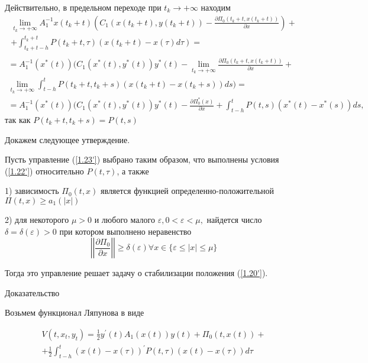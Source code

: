 Действительно, в предельном переходе при $t_k \to + \infty$ находим 
$$
\begin{array}{c}
\displaystyle \lim_{t_k \to + \infty} A_1^{-1} x(t_k + t) (C_1 (x(t_k + t), y(t_k + t)) - \frac{\partial \Pi_0 (t_k + t, x(t_k + t))}{\partial x})+\\
\displaystyle + \int_{t_k+t-h}^{t_k+t} P(t_k + t, \tau) (x(t_k + t) - x(\tau) d \tau)=\\
\end{array}
$$
$$
\begin{array}{c}
\displaystyle = A_1^{-1} (x^{*} (t)) (C_1 (x^{*}(t), y^{*}(t)) y^{*}(t) - \lim_{t_k \to + \infty} \frac{\partial \Pi_0 (t_k +t, x (t_k + t))}{\partial x} +\\
\displaystyle \lim_{t_k \to + \infty} \int_{t - h}^{t} P(t_k + t, t_k + s) ( x(t_k + t) - x(t_k + s)) ds) =\\
\displaystyle =A_1^{-1} ( x^{*} (t)) (C_1 (x^{*} (t), y^{*}(t)) y^{*} (t) - \frac{\partial \Pi_0^{*} (x)}{\partial x} + \int_{t - h}^{t} P (t, s) (x^{*} (t) - x^{*} (s)) ds,
\end{array}
$$
так как $P(t_k + t, t_k + s) = P(t, s)$

Докажем следующее утверждение. 

\begin{theorem} \label{1.6'}
Пусть управление (\ref{1.23'}) выбрано таким образом, что выполнены условия (\ref{1.22'}) относительно $P(t, \tau)$, а также 

1) зависимость $\Pi_0 (t, x)$ является функцией определенно-положительной $\Pi (t, x) \ge a_1 (\left| x \right|)$

 2) для некоторого $\mu > 0$ и любого малого $\varepsilon, 0 < \varepsilon < \mu, $ найдется число $\delta = \delta (\varepsilon) > 0$ при котором выполнено неравенство $$\left| \left| \frac{\partial \Pi_0}{\partial x} \right| \right| \ge \delta (\varepsilon) \forall x \in \lbrace \varepsilon \le \left| x \right| \le \mu \rbrace$$

Тогда это управление решает задачу о стабилизации положения (\ref{1.20'}).
\end{theorem}

Доказательство

Возьмем функционал Ляпунова в виде 

\begin{equation} \label{1.26'}
	\begin{array}{c}
		\displaystyle V(t, x_t, y_t) = \frac12 y^{'} (t) A_1(x(t)) y(t) + \Pi_0(t, x(t)) +\\
		\displaystyle + \frac12 \int_{t-h}^{t} (x(t) - x(\tau))^{'} P(t, \tau) (x(t) - x (\tau)) d \tau
	\end{array}
\end{equation}

